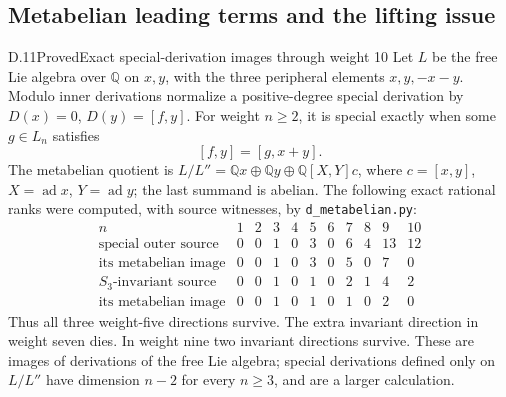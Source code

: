 \subsection{Metabelian leading terms and the lifting issue}

\begin{statement}{D.11}{Proved}{Exact special-derivation images through weight 10}
Let $L$ be the free Lie algebra over $\mathbb Q$ on $x,y$, with the three peripheral elements $x,y,-x-y$. Modulo inner derivations normalize a positive-degree special derivation by $D(x)=0$, $D(y)=[f,y]$. For weight $n\geq2$, it is special exactly when some $g\in L_n$ satisfies
\[
 [f,y]=[g,x+y].                                           \tag{D.10}
\]
The metabelian quotient is
$L/L''=\mathbb Qx\oplus\mathbb Qy\oplus\mathbb Q[X,Y]c$, where $c=[x,y]$, $X=\operatorname{ad}x$, $Y=\operatorname{ad}y$; the last summand is abelian. The following exact rational ranks were computed, with source witnesses, by \texttt{d\_metabelian.py}:
\[
\begin{array}{c|rrrrrrrrrr}
n&1&2&3&4&5&6&7&8&9&10\\\hline
\text{special outer source}&0&0&1&0&3&0&6&4&13&12\\
\text{its metabelian image}&0&0&1&0&3&0&5&0&7&0\\
S_3\text{-invariant source}&0&0&1&0&1&0&2&1&4&2\\
\text{its metabelian image}&0&0&1&0&1&0&1&0&2&0
\end{array}                                               \tag{D.11}
\]
Thus all three weight-five directions survive. The extra invariant direction in weight seven dies. In weight nine two invariant directions survive. These are images of derivations of the free Lie algebra; special derivations defined only on $L/L''$ have dimension $n-2$ for every $n\geq3$, and are a larger calculation.
\end{statement}
